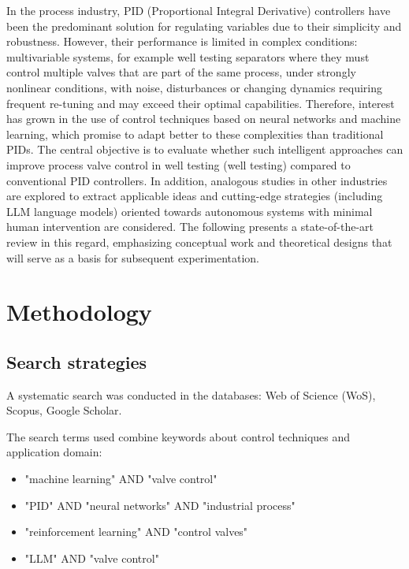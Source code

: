 \documentclass{article}
\begin{document}
In the process industry, PID (Proportional Integral Derivative) controllers have been the predominant solution for regulating variables due to their simplicity and robustness.
However, their performance is limited in complex conditions: multivariable systems, for example well testing separators where they must control multiple valves 
that are part of the same process, under strongly nonlinear conditions, with noise, disturbances or changing dynamics requiring frequent re-tuning and may exceed 
their optimal capabilities. Therefore, interest has grown in the use of control techniques based on neural networks and machine learning, which promise to adapt better to these 
complexities than traditional PIDs. \parencite{cabrera-rufino_implementation_2022} The central objective is to evaluate whether such intelligent approaches can improve process valve control in well 
testing (well testing) \parencite{song_dynamic_2023} compared to conventional PID controllers. In addition, analogous studies in other industries are explored to extract applicable ideas and 
cutting-edge strategies (including LLM language models) oriented towards autonomous systems with minimal human intervention are considered. The following presents a 
state-of-the-art review in this regard, emphasizing conceptual work and theoretical designs that will serve as a basis for subsequent experimentation.

\section{Methodology}

\subsection{Search strategies}

A systematic search was conducted in the databases: Web of Science (WoS), Scopus, Google Scholar. \parencite{liberati_prisma_2009}

The search terms used combine keywords about control techniques and application domain:

\begin{itemize}
  \item "machine learning" AND "valve control"
  \item "PID" AND "neural networks" AND "industrial process"
  \item "reinforcement learning" AND "control valves"
  \item "LLM" AND "valve control"
\end{itemize}
\end{document}
